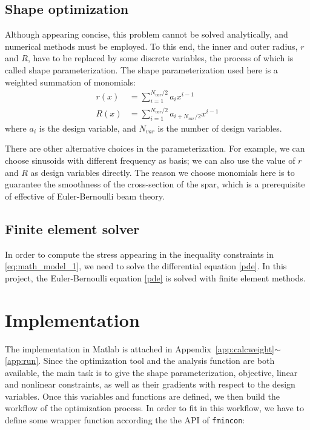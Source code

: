 \documentclass[a4paper]{article}
\begin{document}
\subsection{Shape optimization}\label{shape_param}
Although appearing concise, this problem cannot be solved analytically, and numerical methods must be employed. To this end, the inner and outer radius, $r$ and $R$, have to be replaced by some discrete variables, the process of which is called shape parameterization. The shape parameterization used here is a weighted summation of monomials:
\begin{equation}
\begin{aligned}
r(x) &= \sum_{i=1}^{N_{var}/2} a_ix^{i-1}\\
R(x) &= \sum_{i=1}^{N_{var}/2} a_{i+N_{var}/2}x^{i-1}
\end{aligned}
\end{equation}
where $a_i$ is the design variable, and $N_{var}$ is the number of design variables.

There are other alternative choices in the parameterization. For example, we can choose sinusoids with different frequency as basis; we can also use the value of $r$ and $R$ as design variables directly. The reason we choose monomials here is to guarantee the smoothness of the cross-section of the spar, which is a prerequisite of effective of Euler-Bernoulli beam theory.
\subsection{Finite element solver}
In order to compute the stress appearing in the inequality constraints in \eqref{eq:math_model_1}, we need to solve the differential equation \ref{pde}. In this project, the Euler-Bernoulli equation \eqref{pde} is solved with finite element methods.


\section{Implementation}
The implementation in Matlab is attached in Appendix~\ref{app:calcweight}$\sim$\ref{app:run}. 
Since the optimization tool and the analysis function are both available, the main task is to give the shape parameterization, objective, linear and nonlinear constraints, as well as their gradients with respect to the design variables. Once this variables and functions are defined, we then build the workflow of the optimization process. In order to fit in this workflow, we have to define some wrapper function according the the API of \texttt{fmincon}:
\end{document}
